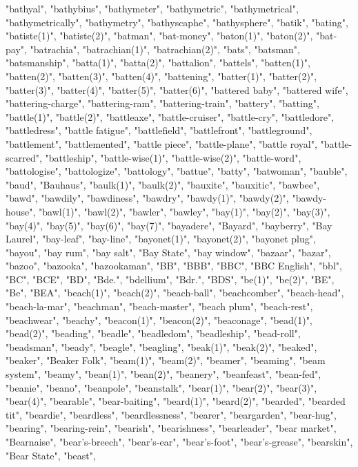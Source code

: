 "bathyal",
"bathybius",
"bathymeter",
"bathymetric",
"bathymetrical",
"bathymetrically",
"bathymetry",
"bathyscaphe",
"bathysphere",
"batik",
"bating",
"batiste(1)",
"batiste(2)",
"batman",
"bat-money",
"baton(1)",
"baton(2)",
"bat-pay",
"batrachia",
"batrachian(1)",
"batrachian(2)",
"bats",
"batsman",
"batsmanship",
"batta(1)",
"batta(2)",
"battalion",
"battels",
"batten(1)",
"batten(2)",
"batten(3)",
"batten(4)",
"battening",
"batter(1)",
"batter(2)",
"batter(3)",
"batter(4)",
"batter(5)",
"batter(6)",
"battered baby",
"battered wife",
"battering-charge",
"battering-ram",
"battering-train",
"battery",
"batting",
"battle(1)",
"battle(2)",
"battleaxe",
"battle-cruiser",
"battle-cry",
"battledore",
"battledress",
"battle fatigue",
"battlefield",
"battlefront",
"battleground",
"battlement",
"battlemented",
"battle piece",
"battle-plane",
"battle royal",
"battle-scarred",
"battleship",
"battle-wise(1)",
"battle-wise(2)",
"battle-word",
"battologise",
"battologize",
"battology",
"battue",
"batty",
"batwoman",
"bauble",
"baud",
"Bauhaus",
"baulk(1)",
"baulk(2)",
"bauxite",
"bauxitic",
"bawbee",
"bawd",
"bawdily",
"bawdiness",
"bawdry",
"bawdy(1)",
"bawdy(2)",
"bawdy-house",
"bawl(1)",
"bawl(2)",
"bawler",
"bawley",
"bay(1)",
"bay(2)",
"bay(3)",
"bay(4)",
"bay(5)",
"bay(6)",
"bay(7)",
"bayadere",
"Bayard",
"bayberry",
"Bay Laurel",
"bay-leaf",
"bay-line",
"bayonet(1)",
"bayonet(2)",
"bayonet plug",
"bayou",
"bay rum",
"bay salt",
"Bay State",
"bay window",
"bazaar",
"bazar",
"bazoo",
"bazooka",
"bazookaman",
"BB",
"BBB",
"BBC",
"BBC English",
"bbl",
"BC",
"BCE",
"BD",
"Bde.",
"bdellium",
"Bdr.",
"BDS",
"be(1)",
"be(2)",
"BE",
"Be",
"BEA",
"beach(1)",
"beach(2)",
"beach-ball",
"beachcomber",
"beach-head",
"beach-la-mar",
"beachman",
"beach-master",
"beach plum",
"beach-rest",
"beachwear",
"beachy",
"beacon(1)",
"beacon(2)",
"beaconage",
"bead(1)",
"bead(2)",
"beading",
"beadle",
"beadledom",
"beadleship",
"bead-roll",
"beadsman",
"beady",
"beagle",
"beagling",
"beak(1)",
"beak(2)",
"beaked",
"beaker",
"Beaker Folk",
"beam(1)",
"beam(2)",
"beamer",
"beaming",
"beam system",
"beamy",
"bean(1)",
"bean(2)",
"beanery",
"beanfeast",
"bean-fed",
"beanie",
"beano",
"beanpole",
"beanstalk",
"bear(1)",
"bear(2)",
"bear(3)",
"bear(4)",
"bearable",
"bear-baiting",
"beard(1)",
"beard(2)",
"bearded",
"bearded tit",
"beardie",
"beardless",
"beardlessness",
"bearer",
"beargarden",
"bear-hug",
"bearing",
"bearing-rein",
"bearish",
"bearishness",
"bearleader",
"bear market",
"Bearnaise",
"bear's-breech",
"bear's-ear",
"bear's-foot",
"bear's-grease",
"bearskin",
"Bear State",
"beast",
